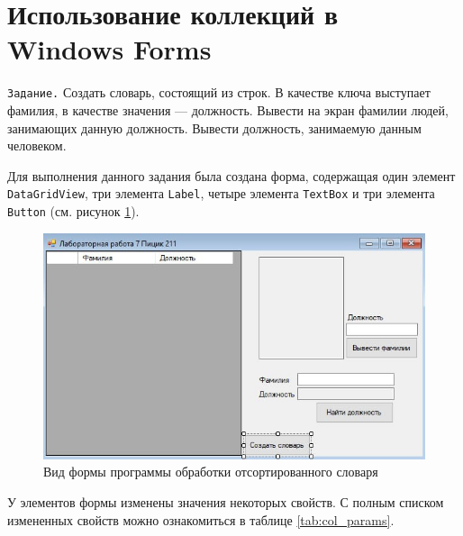 \section{Использование коллекций в Windows Forms}
\verb|Задание.| Создать словарь, состоящий из строк. В качестве ключа выступает фамилия, 
в качестве значения — должность. Вывести на экран фамилии людей, занимающих данную должность. 
Вывести должность, занимаемую данным \newline человеком.

Для выполнения данного задания была создана форма, содержащая один элемент \verb|DataGridView|, 
три элемента \verb|Label|, четыре элемента \verb|TextBox| и три элемента \verb|Button| (см. рисунок 
\ref{fig:col_form}). 
\begin{figure}[H]
    \centering
    \includegraphics[scale=0.68]{../img/collections/collections_form.png}
    \caption{Вид формы программы обработки отсортированного словаря}
    \label{fig:col_form}
\end{figure}

У элементов формы изменены значения некоторых свойств. С полным списком измененных свойств 
можно ознакомиться в таблице \ref{tab:col_params}.

